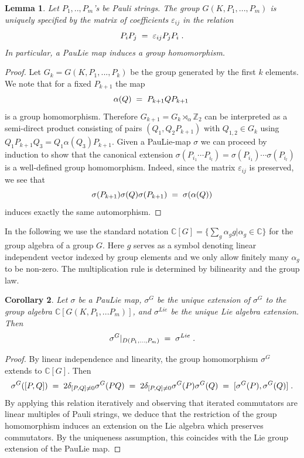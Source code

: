 \documentclass[12pt, a4-paper]{amsart}
\numberwithin{equation}{section}
\newcommand{\lel}{\pl = \pl}
\newcommand{\zz}{{\mathbb Z}}
\newcommand{\cz}{{\mathbb C}}
\newcommand{\pl}{\hspace{.1cm}}
\newcommand{\al}{\alpha}
\newcommand{\eps}{\varepsilon}
\newcommand{\si}{\sigma}
\newtheorem{lemma}{Lemma}[section]
\newtheorem{cor}[lemma]{Corollary}
\begin{document}
\begin{lemma}\label{lem:PauLie_homomorphism} Let $P_1,..,P_m$'s be Pauli strings. The group 
$G(K,P_1,...,P_m)$ is uniquely specified by the  matrix of coefficients $\eps_{ij}$ in the relation 
 \[ P_iP_j\lel \eps_{ij}P_jP_i \pl .\]  
In particular, a  PauLie map induces a group homomorphism.
\end{lemma} 


\begin{proof} Let $G_k=G(K,P_1,...,P_k)$ be the group generated by the first $k$ elements. We note that for a fixed $P_{k+1}$  the map 
 \[ \al(Q) \lel P_{k+1}QP_{k+1} \pl \]
is a group homomorphism. Therefore $G_{k+1}=G_k\rtimes_{\al}\zz_2$ can be interpreted 
as  a semi-direct product consisting of pairs $(Q_1,Q_2P_{k+1})$ with $Q_{1,2}\in G_k$ using 
$Q_1P_{k+1}Q_3=Q_1\al(Q_3)P_{k+1}$. Given a PauLie-map $\si$ we can proceed by induction to show that the canonical extension $\si(P_{i_1}\cdots P_{i_l})=\si(P_{i_1})\cdots \si(P_{i_l})$ is a well-defined group homomorphism. Indeed, since the matrix $\eps_{ij}$ is preserved, we see that 
 \[  \si(P_{k+1})\si(Q)\si(P_{k+1}) \lel \si(\al(Q))   \]
 induces exactly the same automorphism.
 \end{proof}

In the following we use the standard notation  $\cz[G]=\{\sum_g \al_g g| \al_g\in\cz\}$ for the group algebra of a group $G$. Here $g$ serves as a symbol denoting linear independent vector indexed by group elements and we only allow finitely many $\al_g$ to be non-zero. The multiplication rule is determined by bilinearity and the group law.  
\begin{cor}\label{LGG} Let $\si$ be a PauLie map, $\si^{G}$  be the unique extension of $\si^G$  to the group algebra $\cz[G(K,P_1,...P_m)]$, and $\si^{Lie}$ be the unique Lie algebra extension. Then
 \[ \si^{G}|_{D(P_1,...,P_m)} \lel \si^{Lie} \pl .\]
\end{cor} 

\begin{proof} By linear independence and linearity, the group homomorphism $\si^{G}$ extends to $\cz[G]$. Then 
\[ \si^G([P,Q]) \lel 2\delta_{[P,Q]\neq 0}
\si^G(PQ) \lel  2\delta_{[P,Q]\neq 0} \si^G(P)\si^G(Q)
\lel [\si^G(P),\si^G(Q)] \pl . \] 
By applying this relation iteratively and observing that iterated commutators are linear multiples of Pauli strings, we deduce that the restriction of the group homomorphism induces an extension on the Lie algebra which preserves commutators. By the uniqueness assumption, this coincides with the Lie group extension of the PauLie map.
\end{proof}
\end{document}
